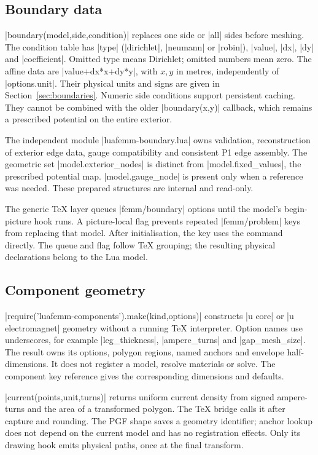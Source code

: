 \subsection{Boundary data}
|boundary(model,side,condition)| replaces one side or |all| sides before
meshing. The condition table has |type| (|dirichlet|, |neumann| or |robin|),
|value|, |dx|, |dy| and |coefficient|. Omitted type means Dirichlet; omitted
numbers mean zero. The affine data are |value+dx*x+dy*y|, with $x,y$ in
metres, independently of |options.unit|. Their physical units and signs
are given in Section~\ref{sec:boundaries}. Numeric side conditions support
persistent caching. They cannot be combined with the older |boundary(x,y)|
callback, which remains a prescribed potential on the entire exterior.

The independent module |luafemm-boundary.lua| owns validation, reconstruction
of exterior edge data, gauge compatibility and consistent P1 edge assembly.
The geometric set |model.exterior_nodes| is distinct from |model.fixed_values|,
the prescribed potential map. |model.gauge_node| is present only when a
reference was needed. These prepared structures are internal and read-only.

The generic TeX layer queues |femm/boundary| options until the model's
begin-picture hook runs. A picture-local flag prevents repeated
|femm/problem| keys from replacing that model. After initialisation,
the key uses the command directly. The queue and flag follow TeX grouping;
the resulting physical declarations belong to the Lua model.

\subsection{Component geometry}
|require('luafemm-components').make(kind,options)| constructs |u core| or
|u electromagnet| geometry without a running TeX interpreter. Option names
use underscores, for example |leg_thickness|, |ampere_turns| and |gap_mesh_size|.
The result owns its options, polygon regions, named anchors and envelope
half-dimensions. It does not register a model, resolve materials or solve.
The component key reference gives the corresponding dimensions and defaults.

|current(points,unit,turns)| returns uniform current density from signed
ampere-turns and the area of a transformed polygon. The TeX bridge calls it
after capture and rounding. The PGF shape saves a geometry identifier; anchor
lookup does not depend on the current model and has no registration effects.
Only its drawing hook emits physical paths, once at the final transform.

